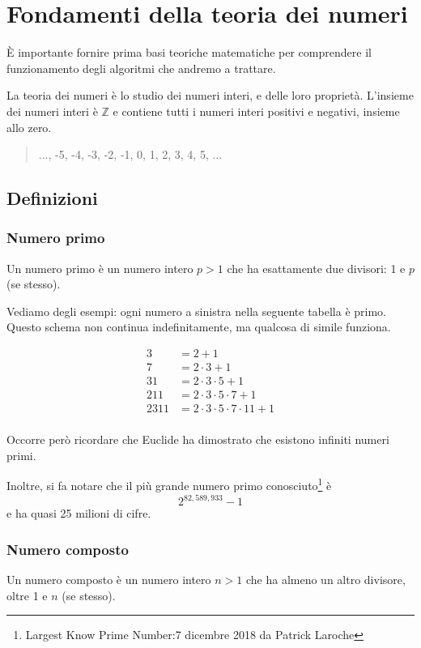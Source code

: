 \documentclass[a4paper,12pt]{report}
\begin{document}
\chapter{Fondamenti della teoria dei numeri}
È importante fornire prima basi teoriche matematiche per comprendere il funzionamento degli algoritmi che andremo a trattare.

La teoria dei numeri è lo studio dei numeri interi, e delle loro proprietà. L'insieme dei numeri interi è $\mathbb{Z}$ e contiene tutti i numeri interi positivi e negativi, insieme allo zero.
\begin{quote}
	\centering
	..., -5, -4, -3, -2, -1, 0, 1, 2, 3, 4, 5, ...
\end{quote}

\section{Definizioni}

\subsection*{Numero primo}
Un numero primo è un numero intero \( p > 1 \) che ha esattamente due divisori: 1 e \(p\) (se stesso).

Vediamo degli esempi: ogni numero a sinistra nella seguente tabella è primo. Questo schema non continua indefinitamente, ma qualcosa di simile funziona.

\[\begin{array}{ll}
3 & = 2 + 1 \\
7 & = 2 \cdot 3 + 1 \\
31 & = 2 \cdot 3 \cdot 5 + 1 \\
211 & = 2 \cdot 3 \cdot 5 \cdot 7 + 1 \\
2311 & = 2 \cdot 3 \cdot 5 \cdot 7 \cdot 11 + 1 \\
\end{array}\]

Occorre però ricordare che Euclide ha dimostrato che esistono infiniti numeri primi. \cite{stein2008}

Inoltre, si fa notare che il più grande numero primo conosciuto\footnote{Largest Know Prime Number:7 dicembre 2018 da Patrick Laroche} è \[2^{82,589,933} - 1\]
e ha quasi 25 milioni di cifre.

\subsection*{Numero composto}
Un numero composto è un numero intero \( n > 1 \) che ha almeno un altro divisore, oltre 1 e \( n \) (se stesso).
\end{document}

